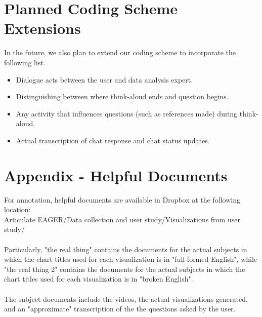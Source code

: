\documentclass[]{article}
\begin{document}
\begin{itemize}
\end{itemize}

\section{Planned Coding Scheme Extensions}
In the future, we also plan to extend our coding scheme to incorporate the following list.

\begin{itemize}
	\item Dialogue acts between the user and data analysis expert.
	\item Distinguishing between where think-aloud ends and question begins.
	\item Any activity that influences questions (such as references made) during think-aloud.
	\item Actual transcription of chat response and chat status updates.
\end{itemize}

\section{Appendix - Helpful Documents}
For annotation, helpful documents are available in Dropbox at the following location: \\
Articulate EAGER/Data collection and user study/Visualizations from user study/
\\\\
Particularly, "the real thing" contains the documents for the actual subjects in which the chart titles used for each visualization is in "full-formed English", while "the real thing 2" contains the documents for the actual subjects in which the chart titles used for each visualization is in "broken English".
\\\\
The subject documents include the videos, the actual visualizations generated, and an "approximate" transcription of the the questions asked by the user.
\end{document}
